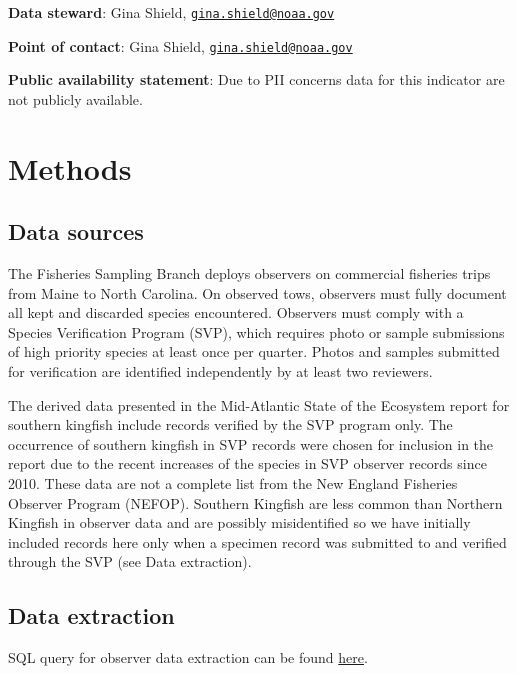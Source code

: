 \documentclass[
]{book}
\begin{document}
\textbf{Data steward}: Gina Shield, \href{mailto:gina.shield@noaa.gov}{\nolinkurl{gina.shield@noaa.gov}}

\textbf{Point of contact}: Gina Shield, \href{mailto:gina.shield@noaa.gov}{\nolinkurl{gina.shield@noaa.gov}}

\textbf{Public availability statement}: Due to PII concerns data for this indicator are not publicly available.

\hypertarget{methods-25}{%
\section{Methods}\label{methods-25}}

\hypertarget{data-sources-25}{%
\subsection{Data sources}\label{data-sources-25}}

The Fisheries Sampling Branch deploys observers on commercial fisheries trips from Maine to North Carolina. On observed tows, observers must fully document all kept and discarded species encountered. Observers must comply with a Species Verification Program (SVP), which requires photo or sample submissions of high priority species at least once per quarter. Photos and samples submitted for verification are identified independently by at least two reviewers.

The derived data presented in the Mid-Atlantic State of the Ecosystem report for southern kingfish include records verified by the SVP program only. The occurrence of southern kingfish in SVP records were chosen for inclusion in the report due to the recent increases of the species in SVP observer records since 2010. These data are not a complete list from the New England Fisheries Observer Program (NEFOP). Southern Kingfish are less common than Northern Kingfish in observer data and are possibly misidentified so we have initially included records here only when a specimen record was submitted to and verified through the SVP (see Data extraction).

\hypertarget{data-extraction-23}{%
\subsection{Data extraction}\label{data-extraction-23}}

SQL query for observer data extraction can be found \href{https://github.com/NOAA-EDAB/tech-doc/blob/master/R/stored_scripts/observer_data_extraction.sql}{here}.
\end{document}
